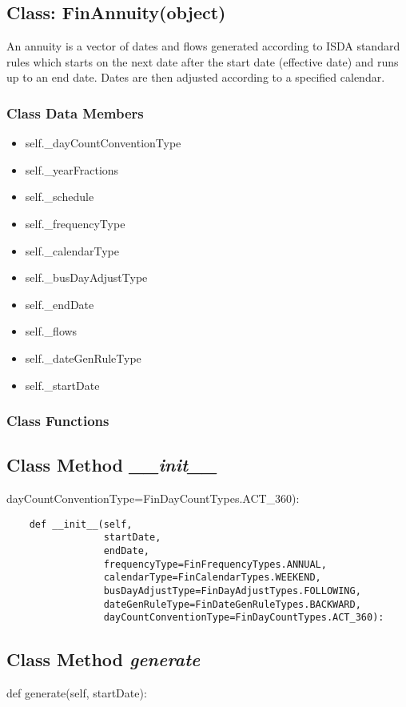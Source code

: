 \documentclass[twoside,11pt]{book}
\begin{document}
\subsection{Class: FinAnnuity(object)}
An annuity is a vector of dates and flows generated according to ISDA standard rules which starts on the next date after the start date (effective date) and runs up to an end date. Dates are then adjusted according to a specified calendar. 

\subsubsection{Class Data Members}
\begin{itemize}
\item{self.\_dayCountConventionType}
\item{self.\_yearFractions}
\item{self.\_schedule}
\item{self.\_frequencyType}
\item{self.\_calendarType}
\item{self.\_busDayAdjustType}
\item{self.\_endDate}
\item{self.\_flows}
\item{self.\_dateGenRuleType}
\item{self.\_startDate}
\end{itemize}

\subsubsection{Class Functions}

\subsection{Class Method {\it \_\_init\_\_}}
dayCountConventionType=FinDayCountTypes.ACT\_360):

\begin{lstlisting}
    def __init__(self,
                 startDate,
                 endDate,
                 frequencyType=FinFrequencyTypes.ANNUAL,
                 calendarType=FinCalendarTypes.WEEKEND,
                 busDayAdjustType=FinDayAdjustTypes.FOLLOWING,
                 dateGenRuleType=FinDateGenRuleTypes.BACKWARD,
                 dayCountConventionType=FinDayCountTypes.ACT_360):
\end{lstlisting}

\subsection{Class Method {\it generate}}
def generate(self, startDate):
\end{document}
